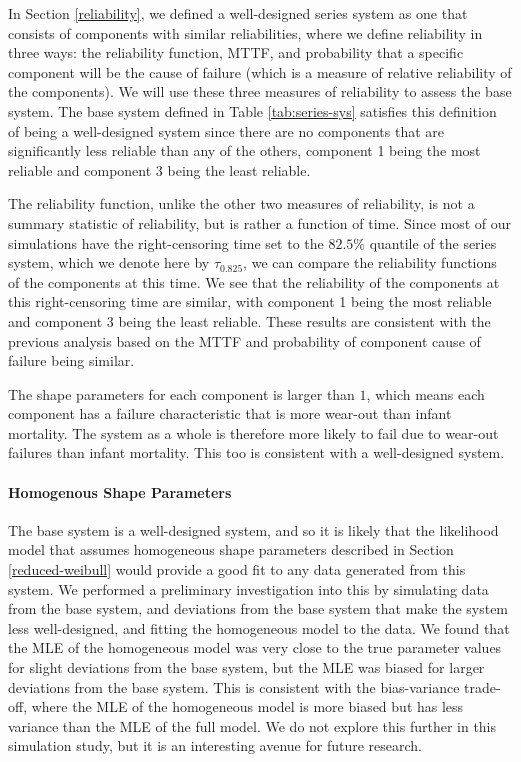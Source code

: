 \documentclass[
]{article}
\theoremstyle{definition}
\theoremstyle{plain}
\theoremstyle{definition}
\theoremstyle{definition}
\theoremstyle{definition}
\theoremstyle{definition}
\theoremstyle{remark}
\begin{document}
In Section \ref{reliability}, we defined a well-designed series system as one
that consists of components with similar reliabilities, where we define
reliability in three ways: the reliability function, MTTF, and probability that
a specific component will be the cause of failure (which is a measure of
relative reliability of the components). We will use these three measures of
reliability to assess the base system. The base system
defined in Table \ref{tab:series-sys} satisfies this definition of being a
well-designed system since there are no components that are significantly
less reliable than any of the others, component 1 being the most reliable and
component 3 being the least reliable.

The reliability function, unlike the other two measures of reliability, is not
a summary statistic of reliability, but is rather a function of time. Since most
of our simulations have the right-censoring time set to the \(82.5\%\) quantile of
the series system, which we denote here by \(\tau_{0.825}\), we can compare the
reliability functions of the components at this time. We see that the
reliability of the components at this right-censoring time are similar, with
component 1 being the most reliable and component 3 being the least reliable.
These results are consistent with the previous analysis based on the MTTF and
probability of component cause of failure being similar.

The shape parameters for each component is larger than \(1\), which means each
component has a failure characteristic that is more wear-out than infant
mortality. The system as a whole is therefore more likely to fail due to
wear-out failures than infant mortality. This too is consistent with a
well-designed system.

\hypertarget{homogenous-shape-parameters}{%
\paragraph*{Homogenous Shape Parameters}\label{homogenous-shape-parameters}}

The base system is a well-designed system, and so it is likely that the
likelihood model that assumes homogeneous shape parameters described in Section
\ref{reduced-weibull} would provide a good fit to any data generated from this
system. We performed a preliminary investigation into this by simulating data
from the base system, and deviations from the base system that make the system
less well-designed, and fitting the homogeneous model to the data. We found that
the MLE of the homogeneous model was very close to the true parameter values for
slight deviations from the base system, but the MLE was biased for larger
deviations from the base system. This is consistent with the bias-variance
trade-off, where the MLE of the homogeneous model is more biased but has less
variance than the MLE of the full model. We do not explore this further in this
simulation study, but it is an interesting avenue for future research.
\end{document}
